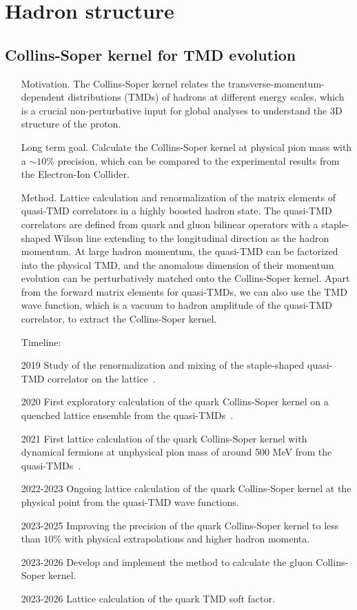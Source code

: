 \documentclass{article}
\begin{document}
\section{Hadron structure}\label{sec:hadstruct}

\subsection{Collins-Soper kernel for TMD evolution}
\begin{itemize}
    \item[Motivation.] The Collins-Soper kernel relates the transverse-momentum-dependent distributions (TMDs) of hadrons at different energy scales, which is a crucial non-perturbative input for global analyses to understand the 3D structure of the proton.
    \item[Long term goal.] Calculate the Collins-Soper kernel at physical pion mass with a $\sim 10\%$ precision, which can be compared to the experimental results from the Electron-Ion Collider.
    \item[Method.] Lattice calculation and renormalization of the matrix elements of quasi-TMD correlators in a highly boosted hadron state. The quasi-TMD correlators are defined from quark and gluon bilinear operators with a staple-shaped Wilson line extending to the longitudinal direction as the hadron momentum. At large hadron momentum, the quasi-TMD can be factorized into the physical TMD, and the anomalous dimension of their momentum evolution can be perturbatively matched onto the Collins-Soper kernel. Apart from the forward matrix elements for quasi-TMDs, we can also use the TMD wave function, which is a vacuum to hadron amplitude of the quasi-TMD correlator, to extract the Collins-Soper kernel.
\item[Timeline:]
    \item[2019] Study of the renormalization and mixing of the staple-shaped quasi-TMD correlator on the lattice~\cite{Shanahan:2019zcq}.
    \item[2020] First exploratory calculation of the quark Collins-Soper kernel on a quenched lattice ensemble from the quasi-TMDs~\cite{Shanahan:2020zxr}.
    \item[2021] First lattice calculation of the quark Collins-Soper kernel with dynamical fermions at unphysical pion mass of around 500 MeV from the quasi-TMDs~\cite{Shanahan:2021tst}.
    \item[2022-2023] Ongoing lattice calculation of the quark Collins-Soper kernel at the physical point from the quasi-TMD wave functions.
    \item[2023-2025] Improving the precision of the quark Collins-Soper kernel to less than $10\%$ with physical extrapolations and higher hadron momenta.
    \item[2023-2026] Develop and implement the method to calculate the gluon Collins-Soper kernel.
    \item[2023-2026] Lattice calculation of the quark TMD soft factor.
\end{itemize}
\end{document}
